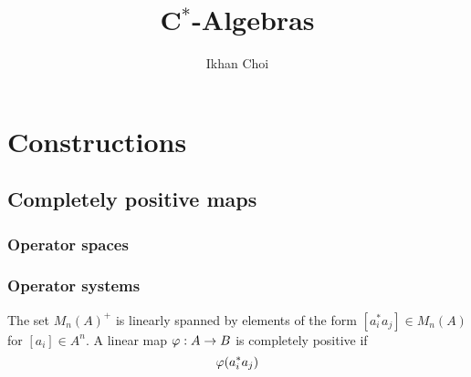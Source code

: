 \documentclass{../../large}
\begin{document}
\title{C$^*$-Algebras}
\author{Ikhan Choi}
\maketitle
\tableofcontents

\part{Constructions}


\chapter{Completely positive maps}
\section{Operator spaces}

\section{Operator systems}

\begin{prb}

\end{prb}

\begin{prb}
\end{prb}


The set $M_n(A)^+$ is linearly spanned by elements of the form $[a_i^*a_j]\in M_n(A)$ for $[a_i]\in A^n$.
A linear map $\varphi:A\to B$ is completely positive if
\[\varphi(a_i^*a_j)\]
\end{document}
